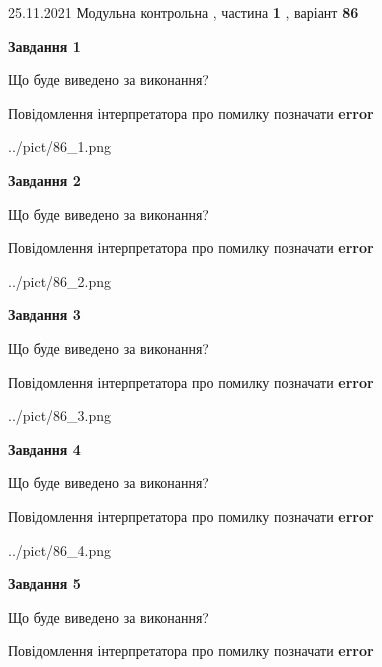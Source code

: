 \documentclass[10pt, ukrainian]{article}
\begin{document}
{25.11.2021 Модульна контрольна , частина \textbf { 1 }, варіант  \No \textbf { 86 }\par}
{
\begin {large}

{\begin {center}\textbf{Завдання 1}\end {center}}\par
Що буде виведено за виконання? \par
Повідомлення інтерпретатора про помилку позначати \textbf{error}

\begin{center}
	{../pict/86_1.png}
\end{center}
\newpage

{\begin {center}\textbf{Завдання 2}\end {center}}\par
Що буде виведено за виконання? \par
Повідомлення інтерпретатора про помилку позначати \textbf{error}

\begin{center}
	{../pict/86_2.png}
\end{center}
\newpage

{\begin {center}\textbf{Завдання 3}\end {center}}\par
Що буде виведено за виконання? \par
Повідомлення інтерпретатора про помилку позначати \textbf{error}

\begin{center}
	{../pict/86_3.png}
\end{center}
\newpage

{\begin {center}\textbf{Завдання 4}\end {center}}\par
Що буде виведено за виконання? \par
Повідомлення інтерпретатора про помилку позначати \textbf{error}

\begin{center}
	{../pict/86_4.png}
\end{center}
\newpage

{\begin {center}\textbf{Завдання 5}\end {center}}\par
Що буде виведено за виконання? \par
Повідомлення інтерпретатора про помилку позначати \textbf{error}


\end{large}}
\end{document}
